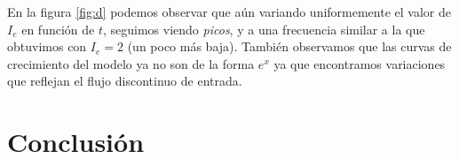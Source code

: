 \documentclass [a4paper,12pt,oneside,final]{article}
\begin{document}
En la figura \ref{fig:d} podemos observar que aún variando uniformemente el valor de $I_e$ en función de $t$, seguimos viendo {\it picos}, y a una frecuencia similar a la que obtuvimos con $I_e = 2$ (un poco más baja). También observamos que las curvas de crecimiento del modelo ya no son de la forma $e^x$ ya que encontramos variaciones que reflejan el flujo discontinuo de entrada.

\section{Conclusión}
\end{document}
